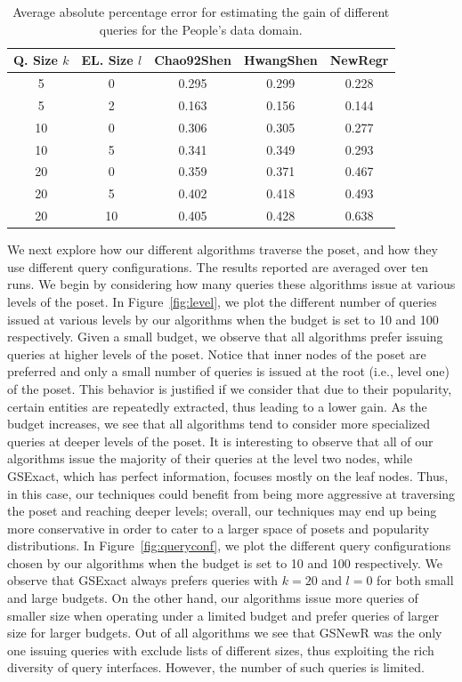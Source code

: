 \begin{table}[h]
\vspace{-5pt}
\scriptsize \center
\caption{Average absolute percentage error for estimating the gain of different queries for the People's data domain.}
\label{tab:peopleesterror}
\begin{tabular}{|c|c|c|c|c|}
\hline
\textbf{Q. Size $k$} & \textbf{EL. Size $l$} & \textbf{Chao92Shen} & \textbf{HwangShen} & \textbf{NewRegr} \\ \hline
5 & 0 & 0.295 & 0.299 & 0.228\\
5 & 2 & 0.163 &  0.156 & 0.144\\
10 & 0 &  0.306 & 0.305 & 0.277\\
10 & 5 &  0.341 & 0.349 & 0.293\\
20 & 0 &  0.359& 0.371 & 0.467 \\
20 & 5 &  0.402 & 0.418 & 0.493\\
20 & 10 & 0.405 & 0.428 & 0.638\\
\hline
\end{tabular}
\vspace{-5pt}
\end{table}

We next explore how our different algorithms traverse the poset, and how they use different query configurations. The results reported are averaged over ten runs. We begin by considering how many queries these algorithms issue at various levels of the poset. In Figure~\ref{fig:level}, we plot the different number of queries issued at various levels by our algorithms when the budget is set to 10 and 100 respectively. Given a small budget, we observe that all algorithms prefer issuing queries at higher levels of the poset. Notice that inner nodes of the poset are preferred and only a small number of queries is issued at the root (i.e., level one) of the poset. This behavior is justified if we consider that due to their popularity, certain entities are repeatedly extracted, thus leading to a lower gain. As the budget increases, we see that all algorithms tend to consider more specialized queries at deeper levels of the poset. It is interesting to observe that all of our algorithms issue the majority of their queries at the level two nodes, while GSExact, which has perfect information, focuses mostly on the leaf nodes. Thus, in this case, our techniques could benefit from being more aggressive at traversing the poset and reaching deeper levels; overall, our techniques may end up being more conservative in order to cater to a larger space of posets and popularity distributions. In Figure~\ref{fig:queryconf}, we plot the different query configurations chosen by our algorithms when the budget is set to 10 and 100 respectively. We observe that GSExact always prefers queries with $k = 20$ and $l = 0$ for both small and large budgets. On the other hand, our algorithms issue more queries of smaller size when operating under a limited budget and prefer queries of larger size for larger budgets. Out of all algorithms we see that GSNewR was the only one issuing queries with exclude lists of different sizes, thus exploiting the rich diversity of query interfaces. However, the number of such queries is limited. 


